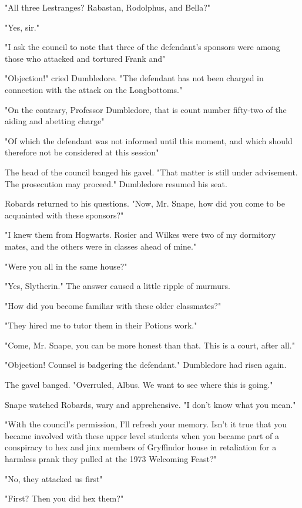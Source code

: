 "All three Lestranges? Rabastan, Rodolphus, and Bella?"

"Yes, sir."

"I ask the council to note that three of the defendant's sponsors were among those who attacked and tortured Frank and{\el}"

"Objection!" cried Dumbledore. "The defendant has not been charged in connection with the attack on the Longbottoms."

"On the contrary, Professor Dumbledore, that is count number fifty-two of the aiding and abetting charge{\el}"

"Of which the defendant was not informed until this moment, and which should therefore not be considered at this session{\el}"

The head of the council banged his gavel. "That matter is still under advisement. The prosecution may proceed." Dumbledore resumed his seat.

Robards returned to his questions. "Now, Mr. Snape, how did you come to be acquainted with these sponsors?"

"I knew them from Hogwarts. Rosier and Wilkes were two of my dormitory mates, and the others were in classes ahead of mine."

"Were you all in the same house?"

"Yes, Slytherin." The answer caused a little ripple of murmurs.

"How did you become familiar with these older classmates?"

"They hired me to tutor them in their Potions work."

"Come, Mr. Snape, you can be more honest than that. This is a court, after all."

"Objection! Counsel is badgering the defendant." Dumbledore had risen again.

The gavel banged. "Overruled, Albus. We want to see where this is going."

Snape watched Robards, wary and apprehensive. "I don't know what you mean."

"With the council's permission, I'll refresh your memory. Isn't it true that you became involved with these upper level students when you became part of a conspiracy to hex and jinx members of Gryffindor house in retaliation for a harmless prank they pulled at the 1973 Welcoming Feast?"

"No, they attacked us first{\el}"

"First? Then you did hex them?"

